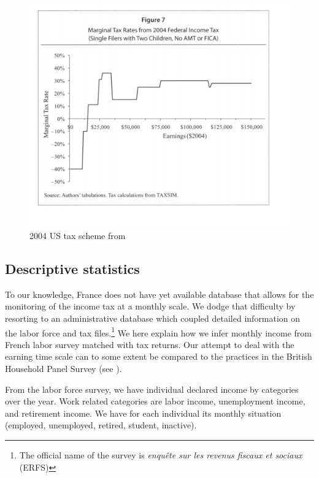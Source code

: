 \begin{figure}[H]
\caption{2004 US tax scheme from \citet{eissa2008redistribution}}
\begin{center}
\includegraphics[width=\textwidth]{MTR_us_2004.png}
\end{center}
\end{figure}
\newpage


\subsection{Descriptive statistics}

To our knowledge, France does not have yet available database that allows for
the monitoring of the income tax at a monthly scale. We dodge that difficulty
by resorting to an administrative database which coupled detailed information
on the labor force and tax files.\footnote{The official name of the survey is
\emph{enqu\^{e}te sur les revenus fiscaux et sociaux} (ERFS)} We here explain
how we infer monthly income from French labor survey matched with tax returns.
Our attempt to deal with the earning time scale can to some extent be compared
to the practices in the British Household Panel Survey (see \citep[p. 4-5]{jenkins2000current}).

From the labor force survey, we have individual declared income by categories
over the year. Work related categories are labor income, unemployment income,
and retirement income. We have for each individual its monthly situation
(employed, unemployed, retired, student, inactive).

